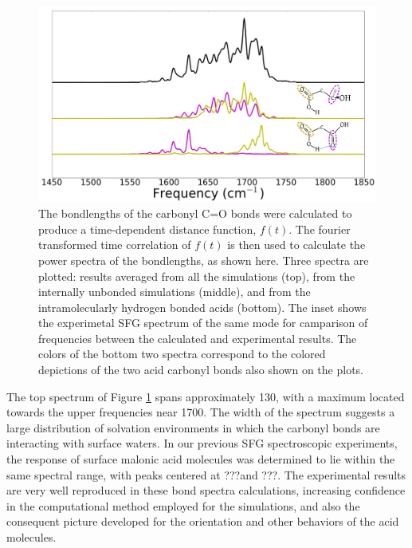 \begin{figure}[h!]
	\begin{center}
		\includegraphics[scale=1.0]{images/bond-spectra/BondSpectra.png}
		\caption{The bondlengths of the carbonyl C=O bonds were calculated to produce a time-dependent distance function, $f(t)$. The fourier transformed time correlation of $f(t)$ is then used to calculate the power spectra of the bondlengths, as shown here. Three spectra are plotted: results averaged from all the simulations (top), from the internally unbonded simulations (middle), and from the intramolecularly hydrogen bonded acids (bottom). The inset shows the experimetal SFG spectrum of the same mode for camparison of frequencies between the calculated and experimental results. The colors of the bottom two spectra correspond to the colored depictions of the two acid carbonyl bonds also shown on the plots.}
		\label{fig:bond-spectra}
	\end{center}
\end{figure}



The top spectrum of Figure \ref{fig:bond-spectra} spans approximately 130\cm, with a maximum located towards the upper frequencies near 1700\cm. The width of the spectrum suggests a large distribution of solvation environments in which the carbonyl bonds are interacting with surface waters. In our previous SFG spectroscopic experiments, the response of surface malonic acid molecules was determined to lie within the same spectral range, with peaks centered at ???\cm and ???\cm. The experimental results are very well reproduced in these bond spectra calculations, increasing confidence in the computational method employed for the simulations, and also the consequent picture developed for the orientation and other behaviors of the acid molecules.

